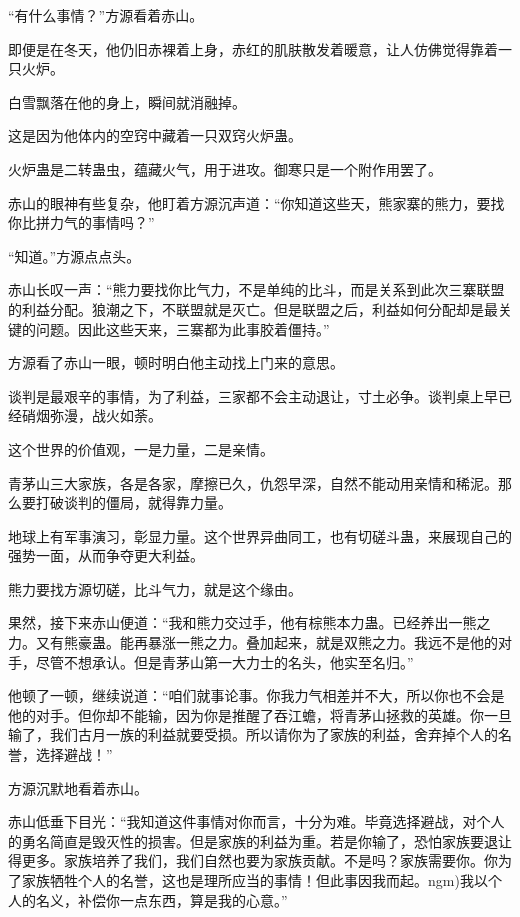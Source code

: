 
\begin{this_body}

“有什么事情？”方源看着赤山。

即便是在冬天，他仍旧赤裸着上身，赤红的肌肤散发着暖意，让人仿佛觉得靠着一只火炉。

白雪飘落在他的身上，瞬间就消融掉。

这是因为他体内的空窍中藏着一只双窍火炉蛊。

火炉蛊是二转蛊虫，蕴藏火气，用于进攻。御寒只是一个附作用罢了。

赤山的眼神有些复杂，他盯着方源沉声道：“你知道这些天，熊家寨的熊力，要找你比拼力气的事情吗？”

“知道。”方源点点头。

赤山长叹一声：“熊力要找你比气力，不是单纯的比斗，而是关系到此次三寨联盟的利益分配。狼潮之下，不联盟就是灭亡。但是联盟之后，利益如何分配却是最关键的问题。因此这些天来，三寨都为此事胶着僵持。”

方源看了赤山一眼，顿时明白他主动找上门来的意思。

谈判是最艰辛的事情，为了利益，三家都不会主动退让，寸土必争。谈判桌上早已经硝烟弥漫，战火如荼。

这个世界的价值观，一是力量，二是亲情。

青茅山三大家族，各是各家，摩擦已久，仇怨早深，自然不能动用亲情和稀泥。那么要打破谈判的僵局，就得靠力量。

地球上有军事演习，彰显力量。这个世界异曲同工，也有切磋斗蛊，来展现自己的强势一面，从而争夺更大利益。

熊力要找方源切磋，比斗气力，就是这个缘由。

果然，接下来赤山便道：“我和熊力交过手，他有棕熊本力蛊。已经养出一熊之力。又有熊豪蛊。能再暴涨一熊之力。叠加起来，就是双熊之力。我远不是他的对手，尽管不想承认。但是青茅山第一大力士的名头，他实至名归。”

他顿了一顿，继续说道：“咱们就事论事。你我力气相差并不大，所以你也不会是他的对手。但你却不能输，因为你是推醒了吞江蟾，将青茅山拯救的英雄。你一旦输了，我们古月一族的利益就要受损。所以请你为了家族的利益，舍弃掉个人的名誉，选择避战！”

方源沉默地看着赤山。

赤山低垂下目光：“我知道这件事情对你而言，十分为难。毕竟选择避战，对个人的勇名简直是毁灭性的损害。但是家族的利益为重。若是你输了，恐怕家族要退让得更多。家族培养了我们，我们自然也要为家族贡献。不是吗？家族需要你。你为了家族牺牲个人的名誉，这也是理所应当的事情！但此事因我而起。ngm)我以个人的名义，补偿你一点东西，算是我的心意。”


\end{this_body}
